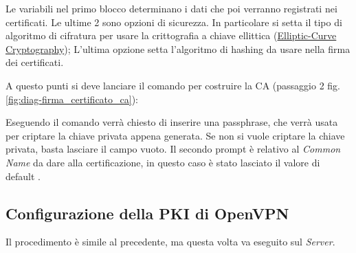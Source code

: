 Le variabili nel primo blocco determinano i dati che poi verranno registrati nei certificati. Le ultime 2 sono opzioni di sicurezza. In particolare si setta il tipo di algoritmo di cifratura per usare la crittografia a chiave ellittica (\href{https://en.wikipedia.org/wiki/Elliptic-curve_cryptography}{Elliptic-Curve Cryptography}); L'ultima opzione setta l'algoritmo di hashing da usare nella firma dei certificati.

A questo punti si deve lanciare il comando  per costruire la CA (passaggio 2 fig.\ref{fig:diag-firma_certificato_ca}):



Eseguendo il comando verrà chiesto di inserire una passphrase, che verrà usata per criptare la chiave privata appena generata. Se non si vuole criptare la chiave privata, basta lasciare il campo vuoto. Il secondo prompt è relativo al \textit{Common Name} da dare alla certificazione, in questo caso è stato lasciato il valore di default .

\subsection{Configurazione della PKI di OpenVPN \ok} %
\label{sec:pki_openvpn}

Il procedimento è simile al precedente, ma questa volta va eseguito sul \textit{Server}.

